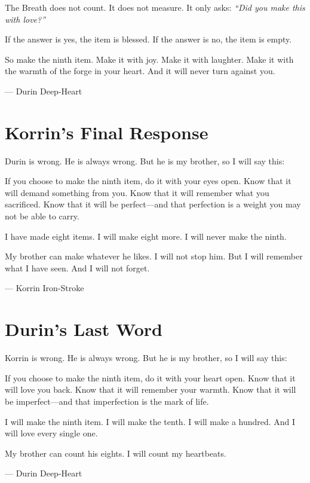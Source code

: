 \documentclass[11pt]{book}
\begin{document}
The Breath does not count. It does not measure. It only asks: \textit{``Did you make this with love?''}

If the answer is yes, the item is blessed. If the answer is no, the item is empty.

So make the ninth item. Make it with joy. Make it with laughter. Make it with the warmth of the forge in your heart. And it will never turn against you.

\vspace{0.5cm}
\hfill --- Durin Deep-Heart

\newpage
\section*{Korrin's Final Response}

Durin is wrong. He is always wrong. But he is my brother, so I will say this:

If you choose to make the ninth item, do it with your eyes open. Know that it will demand something from you. Know that it will remember what you sacrificed. Know that it will be perfect---and that perfection is a weight you may not be able to carry.

I have made eight items. I will make eight more. I will never make the ninth.

My brother can make whatever he likes. I will not stop him. But I will remember what I have seen. And I will not forget.

\vspace{0.5cm}
\hfill --- Korrin Iron-Stroke

\section*{Durin's Last Word}

Korrin is wrong. He is always wrong. But he is my brother, so I will say this:

If you choose to make the ninth item, do it with your heart open. Know that it will love you back. Know that it will remember your warmth. Know that it will be imperfect---and that imperfection is the mark of life.

I will make the ninth item. I will make the tenth. I will make a hundred. And I will love every single one.

My brother can count his eights. I will count my heartbeats.

\vspace{0.5cm}
\hfill --- Durin Deep-Heart
\end{document}
